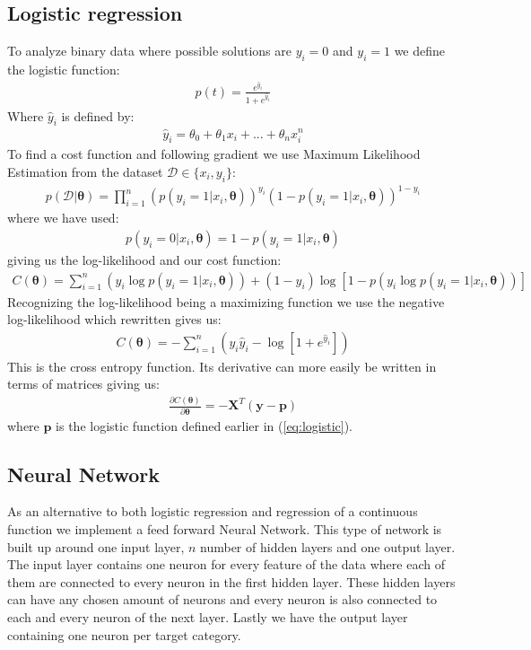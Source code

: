 \documentclass[11pt]{article}
\begin{document}
\subsection{Logistic regression}
To analyze binary data where possible solutions are $y_i=0$ and $y_i=1$ we define the logistic function:
\begin{align}
    \label{eq:logistic}
    p(t) =  \frac{e^{\hat{y}_i}}{1+e^{\hat{y}_i}}
\end{align}
Where $\hat{y}_i$ is defined by:
\begin{align*}
    \hat{y}_i = \theta_0 + \theta_1 x_i +...+ \theta_n x_i^n
\end{align*}
To find a cost function and following gradient we use Maximum Likelihood Estimation from the dataset $\mathcal{D} \in \{x_i, y_i\}$:
\begin{align*}
    p(\mathcal{D}|\boldsymbol{\theta}) = \prod_{i=1}^n (p(y_i = 1|x_i,\boldsymbol{\theta}))^{y_i}\left( 1- p(y_i = 1 | x_i, \boldsymbol{\theta})\right)^{1-y_i}
\end{align*}
where we have used:
\begin{align*}
    p(y_i=0|x_i, \boldsymbol{\theta} ) = 1 - p(y_i=1 | x_i, \boldsymbol{\theta})
\end{align*}
giving us the log-likelihood and our cost function:
\begin{align*}
    C(\boldsymbol{\theta}) = \sum_{i=1}^n (y_i \log p(y_i =1 | x_i, \boldsymbol{\theta})) + (1- y_i) \log [1 - p(y_i \log p(y_i =1 | x_i, \boldsymbol{\theta}))]
\end{align*}
Recognizing the log-likelihood being a maximizing function we use the negative log-likelihood which rewritten gives us:
\begin{align*}
    C(\boldsymbol{\theta}) = -\sum_{i=1}^n (y_i \hat{y}_i - \log [1 + e^{\hat{y}_i}])
\end{align*}
This is the cross entropy function.
Its derivative can more easily be written in terms of matrices giving us:
\begin{align*}
    \frac{\partial C(\boldsymbol{\theta})}{\partial \boldsymbol{\theta}} = - \boldsymbol{X}^T (\boldsymbol{y}- \boldsymbol{p})
\end{align*}
where $\boldsymbol{p}$ is the logistic function defined earlier in (\ref{eq:logistic}).
\subsection{Neural Network}
As an alternative to both logistic regression and regression of a continuous function we implement a feed forward Neural Network. This type of network is built up around one input layer, $n$ number of hidden layers and one output layer. The input layer contains one neuron for every feature of the data where each of them are connected to every neuron in the first hidden layer. These hidden layers can have any chosen amount of neurons and every neuron is also connected to each and every neuron of the next layer. Lastly we have the output layer containing one neuron per target category.
\end{document}
